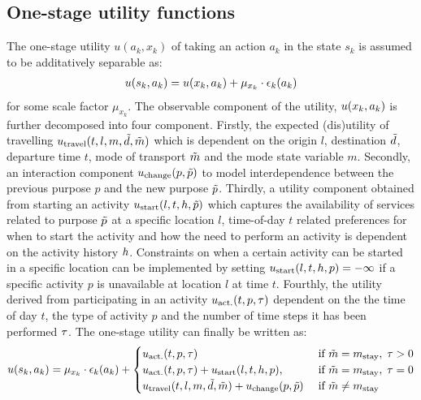 \subsection{One-stage utility functions}
The one-stage utility $u(a_k,x_k)$ of taking an action $a_k$ in the state $s_k$ is assumed to be additatively separable as:
\begin{equation}
\begin{aligned}
	\avgu(s_k,a_k)& =\avgu(x_k,a_k) + \mu_{x_k}\cdot\epsilon_k(a_k)\\
\end{aligned}
\end{equation}
for some scale factor $\mu_{x_k}$. 
The observable component of the utility, $u(x_k,a_k)$ is further decomposed into four component.
Firstly, the expected (dis)utility of travelling $u_\text{travel}(t,l,m,\tilde{d},\tilde{m})$ which is dependent on the origin $l$, destination $\tilde{d}$, departure time $t$, mode of transport $\tilde{m}$ and the mode state variable $m$. Secondly, an interaction component $u_\text{change}(p,\tilde{p})$ to model interdependence between the previous purpose $p$ and the new purpose $\tilde{p}$.
Thirdly, a utility component obtained from starting an activity $u_\text{start}(l,t,h, \tilde{p})$ which captures the availability of services related to purpose $\tilde{p}$ at a specific location $l$, time-of-day $t$ related preferences for when to start the activity and how the need to perform an activity is dependent on the activity history $h$. Constraints on when a certain activity can be started in a specific location can be implemented by setting $u_\text{start}(l,t,h, p)=-\infty$ if a specific activity $p$ is unavailable at location $l$ at time $t$.  Fourthly, the utility derived from participating in an activity $u_\text{act.}(t,p,\tau)$ dependent on the the time of day $t$, the type of activity $p$ and the number of time steps it has been performed $\tau$. The one-stage utility can finally be written as:
\begin{equation} \label{eq:mdponestage}
	\avgu(s_k,a_k) = \mu_{x_k}\cdot\epsilon_k(a_k) + \begin{cases}
	\uact(t,p,\atime) & \cif \act{m} = m_\text{stay}, \; \atime > 0 \\
	\uact(t,p,\atime) + \ustart(l,t,\amem, p), & \cif \act{m} = m_\text{stay},\; \atime = 0 \\
	\utravel(t,l,m,\act{d},\act{m})+\uchange(p,\act{p}) &\cif \act{m} \neq m_\text{stay} 
	\end{cases}
\end{equation}



